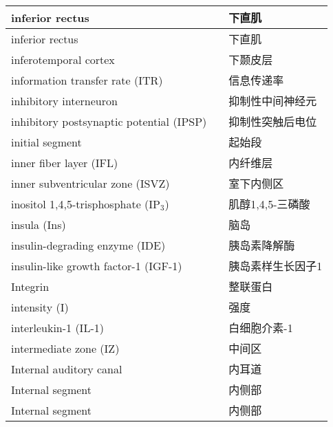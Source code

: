 \begin{longtable}{lll}
	\midrule
	inferior rectus   && 下直肌  \\
	
	\midrule
	inferior rectus   && 下直肌  \\
	
	\midrule
	inferotemporal cortex   && 下颞皮层  \\
	
	\midrule
	information transfer rate (ITR)   && 信息传递率  \\
	
	\midrule
	inhibitory interneuron  && 抑制性中间神经元  \\
	
	\midrule
	inhibitory postsynaptic potential (IPSP)  && 抑制性突触后电位  \\
	
	\midrule
	initial segment && 起始段  \\
	
	\midrule
	inner fiber layer (IFL)   && 内纤维层  \\
	
	\midrule
	inner subventricular zone (ISVZ)   && 室下内侧区  \\
	
	\midrule
	inositol 1,4,5-trisphosphate  (IP$_3$) && 肌醇1,4,5-三磷酸  \\
	
	\midrule
	insula (Ins)   && 脑岛  \\
	
	\midrule
	insulin-degrading enzyme (IDE)   && 胰岛素降解酶  \\
	
	\midrule
	insulin-like growth factor-1 (IGF-1)   && 胰岛素样生长因子1  \\
	
	\midrule
	Integrin  && 整联蛋白  \\
	
	\midrule
	intensity (I)  && 强度  \\
	
	\midrule
	interleukin-1 (IL-1) && 白细胞介素-1  \\
	
	\midrule
	intermediate zone (IZ)  && 中间区  \\
	
	\midrule
	Internal auditory canal   && 内耳道  \\
	
	\midrule
	Internal segment  && 内侧部  \\
	
	\midrule
	Internal segment  && 内侧部  \\
	

\end{longtable}
